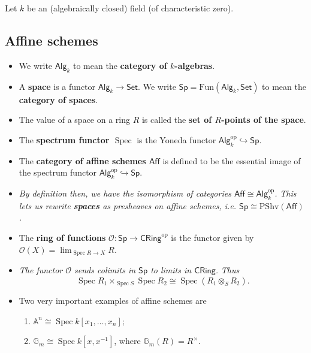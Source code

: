 \documentclass[10pt]{article}
\newcommand{\Set}{\mathsf{Set}}
\newcommand{\Fun}{\mathrm{Fun}}
\newcommand{\PShv}{\mathrm{PShv}}
\newcommand{\aff}{\mathbb{A}}
\newcommand{\kon}{{k[x_1,\ldots,x_n]}}
\newcommand{\Alg}{\mathsf{Alg}}
\newcommand{\Sp}{\mathsf{Sp}}
\newcommand{\Aff}{\mathsf{Aff}}
\newcommand{\CRing}{\mathsf{CRing}}
\newcommand{\op}[1]{{#1}^\text{op}}
\DeclareMathOperator{\spec}{Spec}
\begin{document}
        Let $k$ be an (algebraically closed) field (of characteristic zero).

        \subsection{Affine schemes}

            \begin{itemize}
                \item We write $\Alg_k$ to mean the \textbf{category of $k$-algebras}.
                \item A \textbf{space} is a functor $\Alg_k\to\Set$.
                    We write $\Sp=\Fun(\Alg_k,\Set)$ to mean the \textbf{category of spaces}.
                \item The value of a space on a ring $R$ is called the \textbf{set of $R$-points of the space}.
                \item The \textbf{spectrum functor $\spec$} is the Yoneda functor $\op{\Alg}_k\hookrightarrow\Sp$.
                \item The \textbf{category of affine schemes $\Aff$} is defined to be the essential image of the spectrum functor $\op{\Alg}_k\hookrightarrow\Sp$.
                \item \emph{By definition then, we have the isomorphism of categories $\Aff\cong\op{\Alg}_k$.}
                    \emph{This lets us rewrite \textbf{spaces} as presheaves on affine schemes, i.e. $\Sp\cong\PShv(\Aff)$.}
                \item The \textbf{ring of functions} $\mathcal{O}\colon\Sp\to\op{\CRing}$ is the functor given by $\mathcal{O}(X)=\lim_{\spec R\to X}R$.
                \item \emph{The functor $\mathcal{O}$ sends colimits in $\Sp$ to limits in $\CRing$.}
                    \emph{Thus}
                    \begin{equation*}
                        \spec R_1\times_{\spec S}\spec R_2 \cong \spec(R_1\otimes_S R_2).
                    \end{equation*}
                \item Two very important examples of affine schemes are
                    \begin{enumerate}
                        \item $\aff^n\cong\spec\kon$;
                        \item $\mathbb{G}_m\cong\spec k[x,x^{-1}]$, where $\mathbb{G}_m(R)=R^\times$.
                    \end{enumerate}
            \end{itemize}
\end{document}
